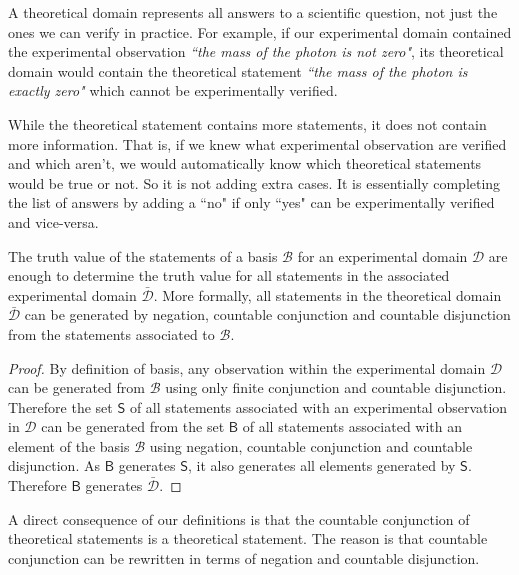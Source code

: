 \documentclass[11pt,letterpaper,fleqn]{memoir} %
\begin{document}
A theoretical domain represents all answers to a scientific question, not just the ones we can verify in practice. For example, if our experimental domain contained the experimental observation \emph{``the mass of the photon is not zero"}, its theoretical domain would contain the theoretical statement \emph{``the mass of the photon is exactly zero"} which cannot be experimentally verified.

While the theoretical statement contains more statements, it does not contain more information. That is, if we knew what experimental observation are verified and which aren't, we would automatically know which theoretical statements would be true or not. So it is not adding extra cases. It is essentially completing the list of answers by adding a ``no" if only ``yes" can be experimentally verified and vice-versa.

\begin{mathSection}
\begin{prop}
	The truth value of the statements of a basis $\mathcal{B}$ for an experimental domain $\mathcal{D}$ are enough to determine the truth value for all statements in the associated experimental domain $\bar{\mathcal{D}}$. More formally, all statements in the theoretical domain $\bar{\mathcal{D}}$ can be generated by negation, countable conjunction and countable disjunction from the statements associated to $\mathcal{B}$.
\end{prop}

\begin{proof}
	By definition of basis, any observation within the experimental domain $\mathcal{D}$ can be generated from $\mathcal{B}$ using only finite conjunction and countable disjunction. Therefore the set $\mathsf{S}$ of all statements associated with an experimental observation in $\mathcal{D}$ can be generated from the set $\mathsf{B}$ of all statements associated with an element of the basis $\mathcal{B}$ using negation, countable conjunction and countable disjunction. As $\mathsf{B}$ generates $\mathsf{S}$, it also generates all elements generated by $\mathsf{S}$. Therefore $\mathsf{B}$ generates $\bar{\mathcal{D}}$.
\end{proof}
\end{mathSection}

A direct consequence of our definitions is that the countable conjunction of theoretical statements is a theoretical statement. The reason is that countable conjunction can be rewritten in terms of negation and countable disjunction.
\end{document}
